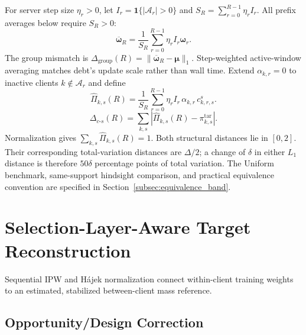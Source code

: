 \documentclass[letterpaper,journal]{IEEEtran}
\begin{document}
For server step size $\eta_r>0$, let
$I_r=\mathbf1\{|\mathcal A_r|>0\}$ and
$S_R=\sum_{r=0}^{R-1}\eta_r I_r$.  All prefix averages below require $S_R>0$:
\begin{equation}
    \overline{\boldsymbol\omega}_R
    =
    \frac{1}{S_R}
    \sum_{r=0}^{R-1}
    \eta_r I_r\boldsymbol\omega_r.
    \label{eq:omega_bar}
\end{equation}
The group mismatch is
$\Delta_{\mathrm{group}}(R)=\|\overline{\boldsymbol\omega}_R-\boldsymbol\mu\|_1$.
Step-weighted active-window averaging matches debt's update scale rather than
wall time.
Extend $\alpha_{k,r}=0$ to inactive clients $k\notin\mathcal A_r$ and define
\begin{equation}
 \widehat\Pi_{k,s}(R)
 =
 \frac{1}{S_R}
 \sum_{r=0}^{R-1}
 \eta_r I_r\,
 \alpha_{k,r}\,
 c^{s}_{k,r,s}.
 \label{eq:Pi_hat_ks}
\end{equation}
\begin{equation}
 \Delta_{c\text{-}s}(R)
 =
 \sum_{k,s}
 \left|
 \widehat\Pi_{k,s}(R)-\pi^{\mathrm{tar}}_{k,s}
 \right|.
 \label{eq:delta_cs}
\end{equation}
Normalization gives $\sum_{k,s}\widehat\Pi_{k,s}(R)=1$.  Both structural
distances lie in $[0,2]$. Their corresponding total-variation distances are
$\Delta/2$; a change of $\delta$ in either $L_1$ distance is therefore
$50\delta$ percentage points of total variation.  The Uniform benchmark, same-support hindsight comparison,
and practical equivalence convention are specified in
Section~\ref{subsec:equivalence_band}.

\FloatBarrier
\section{Selection-Layer-Aware Target Reconstruction}
\label{sec:reconstruction}

Sequential IPW and H\'ajek normalization connect within-client training weights
to an estimated, stabilized between-client mass reference.

\subsection{Opportunity/Design Correction}
\label{subsec:design_correction}
\end{document}
